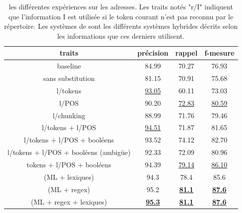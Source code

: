 \documentclass[12pt,a4paper,times,twoside,openright]{report}
\begin{document}
\begin{table}[ht!]
\centering
\begin{tabular}{|c|ccc|}
\hline
traits            & précision & rappel & f-mesure\\
\hline
baseline          & 84.99     & 70.27  & 76.93 \\
sans substitution & 81.15     & 70.91  & 75.68 \\
l/tokens            & \underline{93.05}     & 60.11  & 73.03 \\
l/POS             & 90.20     & \underline{72.83}  & \underline{80.59} \\
l/chunking        & 88.99     & 71.76  & 79.46 \\
\hline
l/tokens + l/POS                      & \underline{94.51} & 71.87             & 81.65 \\
l/tokens + l/POS + booléens           & 93.52             & 74.12             & 82.70 \\
l/tokens + l/POS + booléens (ambigüe) & 92.33             & 72.09             & 80.96 \\
tokens + l/POS + booléens             & 94.39             & \underline{79.14} & \underline{86.10} \\
\hline
\citet{yu2007high} (ML + lexiques)         & 94.3 & 78.4 & 85.6 \\
\citet{yu2007high} (ML + regex)            & 95.2 & \underline{\textbf{81.1}} & \underline{\textbf{87.6}} \\
\citet{yu2007high} (ML + regex + lexiques) & \underline{\textbf{95.3}} & \underline{\textbf{81.1}} & \underline{\textbf{87.6}} \\
\hline
\end{tabular}
\caption{les différentes expériences sur les adresses. Les traits notés "r/I" indiquent que l'information I est utilisée si le token courant n'est pas reconnu par le répertoire. Les systèmes de \citet{yu2007high} sont les différents systèmes hybrides décrits selon les informations que ces derniers utilisent.}
\label{tab:address-quality}
\end{table}
\end{document}
